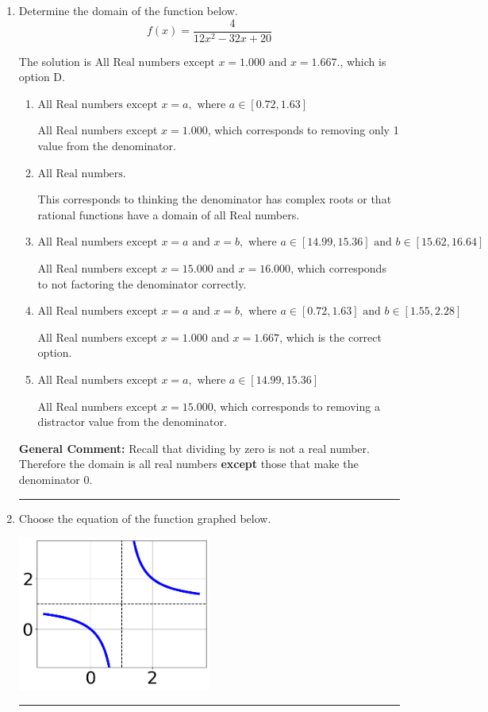 \documentclass{extbook}[14pt]
\newcommand{\litem}[1]{\item #1

\rule{\textwidth}{0.4pt}}
\begin{document}
\begin{enumerate}\litem{
Determine the domain of the function below.
\[ f(x) = \frac{4}{12x^{2} -32 x + 20} \]

The solution is \( \text{All Real numbers except } x = 1.000 \text{ and } x = 1.667. \), which is option D.\begin{enumerate}[label=\Alph*.]
\item \( \text{All Real numbers except } x = a, \text{ where } a \in [0.72, 1.63] \)

All Real numbers except $x = 1.000$, which corresponds to removing only 1 value from the denominator.
\item \( \text{All Real numbers.} \)

This corresponds to thinking the denominator has complex roots or that rational functions have a domain of all Real numbers.
\item \( \text{All Real numbers except } x = a \text{ and } x = b, \text{ where } a \in [14.99, 15.36] \text{ and } b \in [15.62, 16.64] \)

All Real numbers except $x = 15.000$ and $x = 16.000$, which corresponds to not factoring the denominator correctly.
\item \( \text{All Real numbers except } x = a \text{ and } x = b, \text{ where } a \in [0.72, 1.63] \text{ and } b \in [1.55, 2.28] \)

All Real numbers except $x = 1.000$ and $x = 1.667$, which is the correct option.
\item \( \text{All Real numbers except } x = a, \text{ where } a \in [14.99, 15.36] \)

All Real numbers except $x = 15.000$, which corresponds to removing a distractor value from the denominator.
\end{enumerate}

\textbf{General Comment:} Recall that dividing by zero is not a real number. Therefore the domain is all real numbers \textbf{except} those that make the denominator 0.
}
\litem{
Choose the equation of the function graphed below.

\begin{center}
    \includegraphics[width=0.5\textwidth]{../Figures/rationalGraphToEquationC.png}
\end{center}




}
\end{enumerate}
\end{document}
